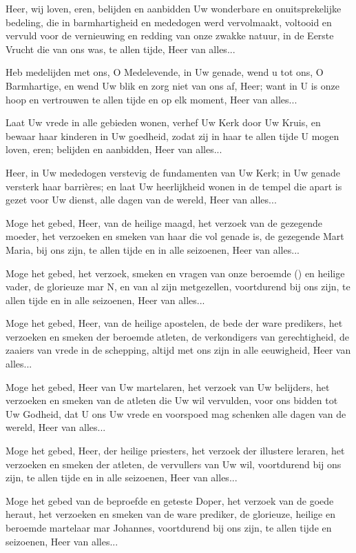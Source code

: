 \documentclass[12pt,twoside,a5paper]{article}
\begin{document}
\begin{halfparskip}

   Heer, wij loven, eren, belijden en aanbidden Uw wonderbare en onuitsprekelijke bedeling, die in barmhartigheid en mededogen werd vervolmaakt, voltooid en vervuld voor de vernieuwing en redding van onze zwakke natuur, in de Eerste Vrucht die van ons was, te allen tijde, Heer van alles...

   Heb medelijden met ons, O Medelevende, in Uw genade, wend u tot ons, O Barmhartige, en wend Uw blik en zorg niet van ons af, Heer; want in U is onze hoop en vertrouwen te allen tijde en op elk moment, Heer van alles...

   Laat Uw vrede in alle gebieden wonen, verhef Uw Kerk door Uw Kruis, en bewaar haar kinderen in Uw goedheid, zodat zij in haar te allen tijde U mogen loven, eren; belijden en aanbidden, Heer van alles...

   Heer, in Uw mededogen verstevig de fundamenten van Uw Kerk; in Uw genade versterk haar barrières; en laat Uw heerlijkheid wonen in de tempel die apart is gezet voor Uw dienst, alle dagen van de wereld, Heer van alles...

   Moge het gebed, Heer, van de heilige maagd, het verzoek van de gezegende moeder, het verzoeken en smeken van haar die vol genade is, de gezegende Mart Maria, bij ons zijn, te allen tijde en in alle seizoenen, Heer van alles...

   Moge het gebed, het verzoek, smeken en vragen van onze beroemde () en heilige vader, de glorieuze mar N, en van al zijn metgezellen, voortdurend bij ons zijn, te allen tijde en in alle seizoenen, Heer van alles...

   Moge het gebed, Heer, van de heilige apostelen, de bede der ware predikers, het verzoeken en smeken der beroemde atleten, de verkondigers van gerechtigheid, de zaaiers van vrede in de schepping, altijd met ons zijn in alle eeuwigheid, Heer van alles...

   Moge het gebed, Heer van Uw martelaren, het verzoek van Uw belijders, het verzoeken en smeken van de atleten die Uw wil vervulden, voor ons bidden tot Uw Godheid, dat U ons Uw vrede en voorspoed mag schenken alle dagen van de wereld, Heer van alles...

   Moge het gebed, Heer, der heilige priesters, het verzoek der illustere leraren, het verzoeken en smeken der atleten, de vervullers van Uw wil, voortdurend bij ons zijn, te allen tijde en in alle seizoenen, Heer van alles...

   Moge het gebed van de beproefde en geteste Doper, het verzoek van de goede heraut, het verzoeken en smeken van de ware prediker, de glorieuze, heilige en beroemde martelaar mar Johannes, voortdurend bij ons zijn, te allen tijde en seizoenen, Heer van alles...
\end{halfparskip}
\end{document}
